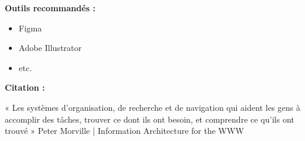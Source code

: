 \textbf{Outils recommandés :}

\begin{itemize}
\item Figma
\item Adobe Illustrator
\item etc.
\end{itemize}

\textbf{Citation :}

« Les systèmes d'organisation, de recherche et de navigation qui aident les gens à accomplir des tâches, trouver ce dont ils ont besoin, et comprendre ce qu'ils ont trouvé » Peter Morville | Information Architecture for the WWW

